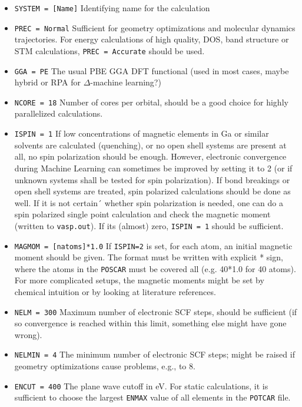\documentclass[a4paper,11pt]{article}
\begin{document}
\begin{itemize}

\item \texttt{SYSTEM = [Name]}  Identifying name for the calculation
\item \texttt{PREC = Normal}   Sufficient for geometry optimizations and molecular dynamics trajectories.
   For energy calculations of high quality, DOS, band structure or STM calculations, \texttt{PREC = Accurate}
   should be used.
\item \texttt{GGA = PE} The usual PBE GGA DFT functional (used in most cases, maybe
hybrid or RPA for $\Delta$-machine learning?)
\item \texttt{NCORE = 18}  Number of cores per orbital, should be a good choice for
highly parallelized calculations.
\item \texttt{ISPIN = 1}  If low concentrations of magnetic elements in Ga or similar solvents 
are calculated (quenching), or no open shell systems are present at all, no spin polarization
should be enough. However, electronic
convergence during Machine Learning can sometimes be improved by setting it to 2 (or if unknown systems
shall be tested for spin polarization). If bond breakings or open shell systems are treated, spin
polarized calculations should be done as well. If it is not certain´ whether spin polarization is needed,
one can do a spin polarized single point calculation and check the magnetic moment (written to \texttt{vasp.out}).
If its (almost) zero, \texttt{ISPIN = 1} should be sufficient.
\item \texttt{MAGMOM = [natoms]*1.0}  If \texttt{ISPIN=2} is set, for each atom, an initial magnetic 
moment should be given. The format must be written with explicit * sign, where the atoms in 
the \texttt{POSCAR} must be covered all (e.g. 40*1.0 for 40 atoms). For more complicated setups, the magnetic 
moments might be set by chemical intuition or by looking at literature references.
\item \texttt{NELM = 300}   Maximum number of electronic SCF steps, should be sufficient (if so 
convergence is reached within this limit, something else might have gone wrong).
\item \texttt{NELMIN = 4}  The minimum number of electronic SCF steps; might be raised if geometry 
optimizations cause problems, e.g., to 8.
\item \texttt{ENCUT = 400}   The plane wave cutoff in eV. For static calculations, it is
sufficient to choose the largest \texttt{ENMAX} value of all elements in the \texttt{POTCAR} file.

\end{itemize}
\end{document}

